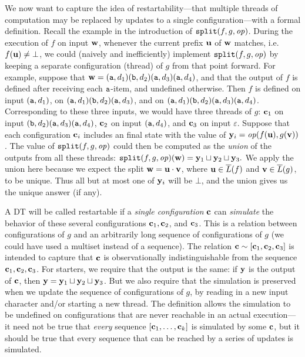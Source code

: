 We now want to capture the idea of restartability---that multiple threads of computation may be replaced by updates to a single configuration---with a formal definition. Recall the example in the introduction of $\texttt{split}(f,g,\mathit{op})$.
During the execution of $f$ on input $\mathbf{w}$, whenever the current prefix $\mathbf{u}$ of $\mathbf{w}$ matches, i.e. $f(\mathbf{u}) \ne \bot$, we could (naively and inefficiently) implement $\texttt{split}(f,g,\mathit{op})$ by keeping a separate configuration (thread) of $g$ from that point forward. For example, suppose that $\mathbf{w} = ({\texttt{a}}, d_1) ({\texttt{b}}, d_2) ({\texttt{a}}, d_3) ({\texttt{a}}, d_4)$, and that the output of $f$ is defined after receiving each ${\texttt{a}}$-item, and undefined otherwise. Then $f$ is defined on input $({\texttt{a}}, d_1)$, on $({\texttt{a}}, d_1)({\texttt{b}}, d_2)({\texttt{a}}, d_3)$, and on $({\texttt{a}}, d_1)({\texttt{b}}, d_2)({\texttt{a}}, d_3)({\texttt{a}}, d_4)$. Corresponding to these three inputs, we would have three threads of $g$: $\mathbf{c}_1$ on input $({\texttt{b}}, d_2) ({\texttt{a}}, d_3) ({\texttt{a}}, d_4)$, $\mathbf{c}_2$ on input $({\texttt{a}}, d_4)$, and $\mathbf{c}_3$ on input $\varepsilon$. Suppose that each configuration $\mathbf{c}_i$ includes an final state with the value of $\mathbf{y}_i = \mathit{op}(f(\mathbf{u}),g(\mathbf{v}))$.
The value of $\texttt{split}(f,g,\mathit{op})$ could then be computed as the \emph{union} of the outputs from all these threads:
$\texttt{split}(f,g,\mathit{op})(\mathbf{w}) = \mathbf{y}_1 \sqcup \mathbf{y}_2 \sqcup \mathbf{y}_3.$
We apply the union here because we expect the split $\mathbf{w} = \mathbf{u} \cdot \mathbf{v}$, where $\mathbf{u} \in \overline{L}(f)$ and $\mathbf{v} \in \overline{L}(g)$, to be unique. Thus all but at most one of $\mathbf{y}_i$ will be $\bot$, and the union gives us the unique answer (if any).

A DT will be called restartable if a \emph{single configuration} $\mathbf{c}$ can \emph{simulate} the behavior of these several configurations $\mathbf{c}_1, \mathbf{c}_2$, and $\mathbf{c}_3$. This is a relation between configurations of $g$ and an arbitrarily long sequence of configurations of $g$ (we could have used a multiset instead of a sequence). The relation $\mathbf{c} \sim [\mathbf{c}_1, \mathbf{c}_2, \mathbf{c}_3]$ is intended to capture that $\mathbf{c}$ is observationally indistinguishable from the sequence $\mathbf{c}_1, \mathbf{c}_2, \mathbf{c}_3$. For starters, we require that the output is the same: if $\mathbf{y}$ is the output of $\mathbf{c}$, then $\mathbf{y} = \mathbf{y}_1 \sqcup \mathbf{y}_2 \sqcup \mathbf{y}_3$. But we also require that the simulation is preserved when we update the sequence of configurations of $g$, by reading in a new input character and/or starting a new thread. The definition allows the simulation to be undefined on configurations that are never reachable in an actual execution---it need not be true that \emph{every} sequence $[\mathbf{c}_1, \ldots, \mathbf{c}_k]$ is simulated by some $\mathbf{c}$, but it should be true that every sequence that can be reached by a series of updates is simulated.

